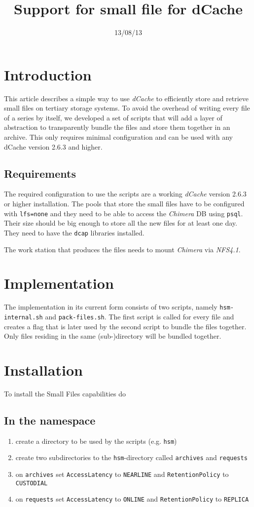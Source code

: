 \documentclass[a4paper,8pt]{scrartcl}
\title{Support for small file for dCache}
\date{13/08/13}
\begin{document}
\titlepage

\section{Introduction}
This article describes a simple way to use \emph{dCache} to efficiently store
and retrieve small files on tertiary storage systems. To avoid the overhead of
writing every file of a series by itself, we developed a set of scripts that
will add a layer of abstraction to transparently bundle the files and store them
together in an archive. This only requires minimal configuration and can be used
with any dCache version 2.6.3 and higher.

\subsection{Requirements}
The required configuration to use the scripts are a working \emph{dCache}
version 2.6.3 or higher installation. The pools that store the small files have
to be configured with \texttt{lfs=none} and they need to be able to access the
\emph{Chimera} DB using \texttt{psql}. Their size should be big enough to store
all the new files for at least one day. They need to have the \texttt{dcap}
libraries installed. 

The work station that produces the files needs to mount \emph{Chimera} via
\emph{NFS4.1}.

\section{Implementation} 
The implementation in its current form consists of two scripts, namely
\texttt{hsm-internal.sh} and \texttt{pack-files.sh}. The first script is called
for every file and creates a flag that is later used by the second script to
bundle the files together. Only files residing in the same (sub-)directory will 
be bundled together.

\section{Installation}
To install the Small Files capabilities do

\subsection{In the namespace}
\begin{enumerate}
  \item create a directory to be used by the scripts (e.g. \texttt{hsm})
  \item create two subdirectories to the \texttt{hsm}-directory called \texttt{archives} and \texttt{requests}
  \item on \texttt{archives} set \texttt{AccessLatency} to \texttt{NEARLINE} and \texttt{RetentionPolicy} to \texttt{CUSTODIAL}
  \item on \texttt{requests} set \texttt{AccessLatency} to \texttt{ONLINE} and \texttt{RetentionPolicy} to \texttt{REPLICA}
\end{enumerate}
\end{document}
